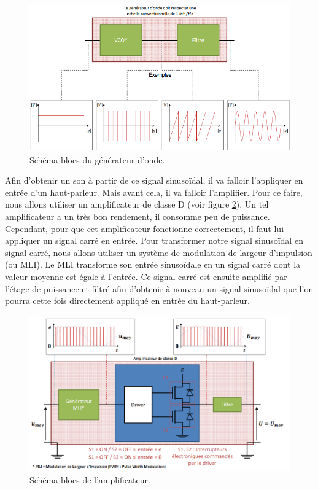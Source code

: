 \begin{figure}[ht]
	\centering
	\includegraphics[scale=0.65]{img-gf/gf-generator.png}
	\caption{Schéma blocs du générateur d'onde.}
	\label{fig:gf-generator}
\end{figure}

Afin d'obtenir un son à partir de ce signal sinusoïdal, il
va falloir l'appliquer en entrée d'un haut-parleur. Mais avant
cela, il va falloir l'amplifier. Pour ce faire, nous allons
utiliser un amplificateur de classe D (voir figure
\ref{fig:gf-ampli}). Un tel amplificateur
a	un très bon rendement, il consomme peu de puissance. Cependant,
pour que cet amplificateur fonctionne correctement, il faut
lui appliquer un signal carré en entrée. Pour transformer
notre signal sinusoïdal en signal carré, nous allons utiliser un
système de modulation de largeur d'impulsion (ou MLI). Le MLI
transforme son entrée sinusoïdale en un signal carré dont la
valeur moyenne est égale à l'entrée. Ce
signal carré est ensuite amplifié par l'étage de puissance
et filtré afin d'obtenir à nouveau un signal sinusoïdal que
l'on pourra cette fois directement appliqué en entrée du haut-parleur.

\begin{figure}[ht]
	\centering
	\includegraphics[scale=0.60]{img-gf/gf-ampli.png}
	\caption{Schéma blocs de l'amplificateur.}
	\label{fig:gf-ampli}
\end{figure}

